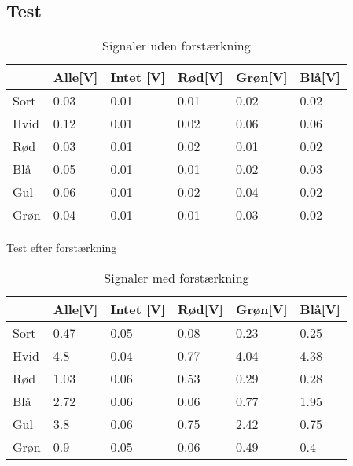 \subsection{Test}
\begin{table}[H]
\centering
\caption{Signaler uden forstærkning} \label{tab:farveudenforstaerker}
\label{my-label}
\begin{tabular}{l|lllll}
\hline \hline
     & Alle{[\si{V}]} & Intet {[\si{V}]} & Rød{[\si{V}]} & Grøn{[\si{V}]} & Blå{[\si{V}]} \\
     \hline
Sort & 0.03        & 0.01          & 0.01       & 0.02        & 0.02       \\
Hvid & 0.12        & 0.01          & 0.02       & 0.06        & 0.06       \\
Rød  & 0.03        & 0.01          & 0.02       & 0.01        & 0.02       \\
Blå  & 0.05        & 0.01          & 0.01       & 0.02        & 0.03       \\
Gul  & 0.06        & 0.01          & 0.02       & 0.04        & 0.02       \\
Grøn & 0.04        & 0.01          & 0.01       & 0.03        & 0.02 \\[1ex]
\hline     
\end{tabular}
\end{table}

Test efter forstærkning
\begin{table}[H]
\centering
\caption{Signaler med forstærkning} \label{tab:farvemedforstaerker}
\begin{tabular}{l|lllll}
\hline\hline
     & Alle{[\si{V}]} & Intet {[\si{V}]} & Rød{[\si{V}]} & Grøn{[\si{V}]} & Blå{[\si{V}]} \\
     \hline
Sort & 0.47        & 0.05          & 0.08       & 0.23        & 0.25       \\
Hvid & 4.8         & 0.04          & 0.77       & 4.04        & 4.38       \\
Rød  & 1.03        & 0.06          & 0.53       & 0.29        & 0.28       \\
Blå  & 2.72        & 0.06          & 0.06       & 0.77        & 1.95       \\
Gul  & 3.8         & 0.06          & 0.75       & 2.42        & 0.75       \\
Grøn & 0.9         & 0.05          & 0.06       & 0.49        & 0.4 \\[1ex]
\hline
\end{tabular}
\end{table}


